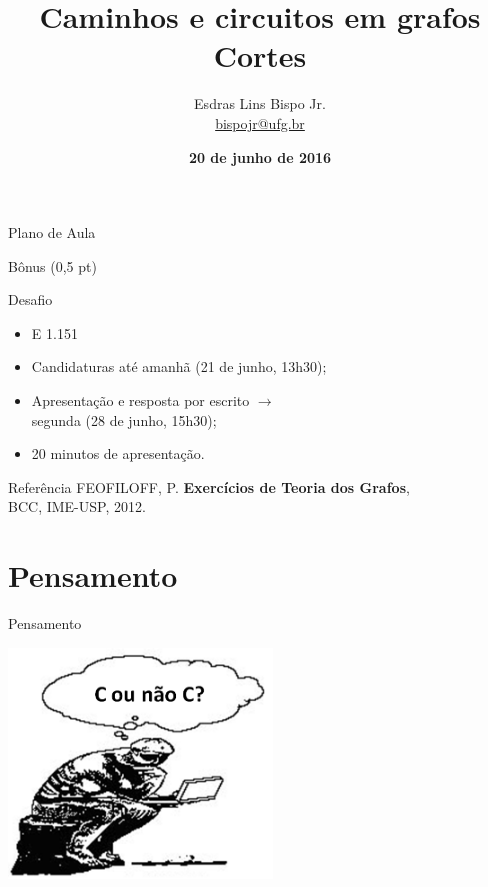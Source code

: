 \documentclass[xcolor=dvipsnames,table]{beamer}
\title{Caminhos e circuitos em grafos \\Cortes}
\author{
  Esdras Lins Bispo Jr. \\ \url{bispojr@ufg.br}
  }
\institute{
  Teoria de Grafos \\Bacharelado em Ciência da Computação}
\date{\textbf{20 de junho de 2016} }
\begin{document}
	\begin{frame}
		\titlepage
	\end{frame}

	\AtBeginSection{
		\begin{frame}{Sumário}%
    		\tableofcontents[currentsection]
		\end{frame}
	}

	\begin{frame}{Plano de Aula}
		\tableofcontents
	\end{frame}
	
	\begin{frame}{Bônus (0,5 pt)}
		\begin{block}{Desafio}
			\begin{itemize}
				\item {E 1.151} 
                \item Candidaturas até amanhã (21 de junho, 13h30); 
                \item Apresentação e resposta por escrito $\rightarrow$ \\segunda (28 de junho, 15h30); 
                \item 20 minutos de apresentação.
			\end{itemize}
		\end{block}
        \begin{block}{Referência}
			FEOFILOFF, P. {\bf Exercícios de Teoria dos Grafos}, \\
			BCC, IME-USP, 2012. 
		\end{block}	
	\end{frame}
	
	\section{Pensamento}
	\begin{frame}{Pensamento}
  		\begin{center}
    		\includegraphics[width=7cm]{images/pensamento.png}
  		\end{center}
	\end{frame}
	
\end{document}
